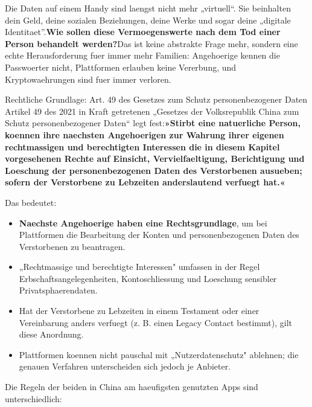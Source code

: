 
Die Daten auf einem Handy sind laengst nicht mehr „virtuell“. Sie beinhalten dein Geld, deine sozialen Beziehungen, deine Werke und sogar deine „digitale Identitaet”.\textbf{Wie sollen diese Vermoegenswerte nach dem Tod einer Person behandelt werden?}Das ist keine abstrakte Frage mehr, sondern eine echte Herausforderung fuer immer mehr Familien: Angehoerige kennen die Passwoerter nicht, Plattformen erlauben keine Vererbung, und Kryptowaehrungen sind fuer immer verloren.

\begin{tcbinfo}{Rechtliche Grundlage: Art. 49 des Gesetzes zum Schutz personenbezogener Daten}
Artikel 49 des 2021 in Kraft getretenen „Gesetzes der Volksrepublik China zum Schutz personenbezogener Daten“ legt fest:\textbf{»Stirbt eine natuerliche Person, koennen ihre naechsten Angehoerigen zur Wahrung ihrer eigenen rechtmassigen und berechtigten Interessen die in diesem Kapitel vorgesehenen Rechte auf Einsicht, Vervielfaeltigung, Berichtigung und Loeschung der personenbezogenen Daten des Verstorbenen ausueben; sofern der Verstorbene zu Lebzeiten anderslautend verfuegt hat.«}

Das bedeutet:

\begin{itemize}
  \item \textbf{Naechste Angehoerige haben eine Rechtsgrundlage}, um bei Plattformen die Bearbeitung der Konten und personenbezogenen Daten des Verstorbenen zu beantragen.
  \item „Rechtmassige und berechtigte Interessen" umfassen in der Regel Erbschaftsangelegenheiten, Kontoschliessung und Loeschung sensibler Privatsphaerendaten.
  \item Hat der Verstorbene zu Lebzeiten in einem Testament oder einer Vereinbarung anders verfuegt (z. B. einen Legacy Contact bestimmt), gilt diese Anordnung.
  \item Plattformen koennen nicht pauschal mit „Nutzerdatenschutz" ablehnen; die genauen Verfahren unterscheiden sich jedoch je Anbieter.
\end{itemize}

\end{tcbinfo}


Die Regeln der beiden in China am haeufigsten genutzten Apps sind unterschiedlich:


